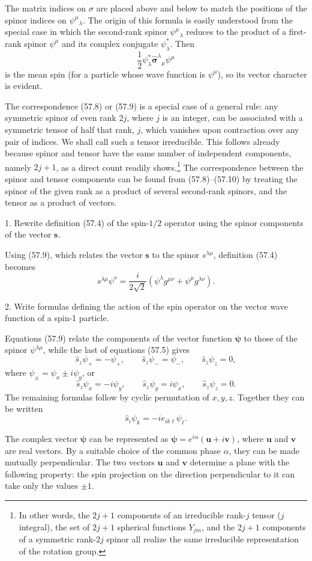 The matrix indices on $\sigma$ are placed above and below to match the
positions of the spinor indices on $\psi^\mu{}_{\lambda}$. The origin of this
formula is easily understood from the special case in which the second-rank
spinor $\psi^\mu{}_{\lambda}$ reduces to the product of a first-rank spinor
$\psi^\mu$ and its complex conjugate $\psi_{\lambda}^*$. Then
\[
 \frac12\psi_\lambda^*\hat{\boldsymbol\sigma}^\lambda{}_{\mu}\psi^\mu
\]
is the mean spin (for a particle whose wave function is $\psi^\mu$), so its
vector character is evident.

The correspondence (57.8) or (57.9) is a special case of a general rule: any
symmetric spinor of even rank $2j$, where $j$ is an integer, can be associated
with a symmetric tensor of half that rank, $j$, which vanishes upon
contraction over any pair of indices. We shall call such a tensor
irreducible. This follows already because spinor and tensor have the same
number of independent components, namely $2j+1$, as a direct count readily
shows.\footnote{In other words, the $2j+1$ components of an irreducible
rank-$j$ tensor ($j$ integral), the set of $2j+1$ spherical functions
$Y_{jm}$, and the $2j+1$ components of a symmetric rank-$2j$ spinor all
realize the same irreducible representation of the rotation group.} The
correspondence between the spinor and tensor components can be found from
(57.8)--(57.10) by treating the spinor of the given rank as a product of
several second-rank spinors, and the tensor as a product of vectors.

\ProblemHeading

1. Rewrite definition (57.4) of the spin-$1/2$ operator using the spinor
components of the vector $\mathbf s$.

\SolutionHeading

Using (57.9), which relates the vector $\mathbf s$ to the spinor
$s^{\lambda\mu}$, definition (57.4) becomes
\[
 s^{\lambda\mu}\psi^\nu=\frac i{2\sqrt2}
 (\psi^\lambda g^{\mu\nu}+\psi^\mu g^{\lambda\nu}).
\]

2. Write formulas defining the action of the spin operator on the vector wave
function of a spin-1 particle.

\SolutionHeading

Equations (57.9) relate the components of the vector function
$\boldsymbol\psi$ to those of the spinor $\psi^{\lambda\mu}$, while the last
of equations (57.5) gives
\[
 \hat s_z\psi_+=-\psi_+,
 \qquad \hat s_z\psi_-=\psi_-,
 \qquad \hat s_z\psi_z=0,
\]
where $\psi_\pm=\psi_x\pm i\psi_y$, or
\[
 \hat s_z\psi_x=-i\psi_y,\qquad
 \hat s_z\psi_y=i\psi_x,\qquad
 \hat s_z\psi_z=0.
\]
The remaining formulas follow by cyclic permutation of $x,y,z$. Together
they can be written
\[
 \hat s_i\psi_k=-ie_{ik\ell}\psi_\ell.
\]

The complex vector $\boldsymbol\psi$ can be represented as
$\boldsymbol\psi=e^{i\alpha}(\mathbf u+i\mathbf v)$, where $\mathbf u$ and
$\mathbf v$ are real vectors. By a suitable choice of the common phase
$\alpha$, they can be made mutually perpendicular. The two vectors
$\mathbf u$ and $\mathbf v$ determine a plane with the following property:
the spin projection on the direction perpendicular to it can take only the
values $\pm1$.
